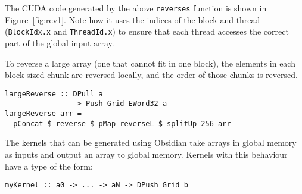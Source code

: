 The CUDA code generated by the above \verb!reverses! function is shown in 
Figure~\ref{fig:rev1}. Note how it uses the indices of the block 
and thread (\verb!BlockIdx.x! and \verb!ThreadId.x!)
to ensure that each thread accesses the correct part of
the global input array.







To reverse a large array (one that cannot fit in one block), the elements
in each block-sized chunk are reversed locally, and the order of those chunks is reversed.


\begin{small} 
\begin{verbatim} 
largeReverse :: DPull a
                -> Push Grid EWord32 a
largeReverse arr =
  pConcat $ reverse $ pMap reverseL $ splitUp 256 arr 
\end{verbatim} 
\end{small} 

The kernels that can be generated using Obsidian take arrays 
in global memory as inputs and output an array to global memory. 
Kernels with this behaviour have a type of the form: 

\begin{small} 
\begin{Verbatim}[samepage=true]
myKernel :: a0 -> ... -> aN -> DPush Grid b 
\end{Verbatim} 
\end{small} 

